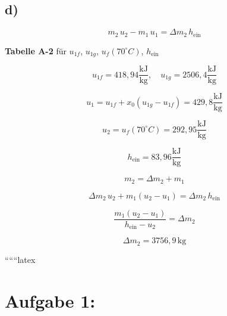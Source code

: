 

\subsection*{d)}

\begin{equation*}
m_2 \, u_2 - m_1 \, u_1 = \Delta m_2 \, h_{\text{ein}}
\end{equation*}

\textbf{Tabelle A-2} für $u_{1f}$, $u_{1g}$, $u_f (70^\circ C)$, $h_{\text{ein}}$

\begin{equation*}
u_{1f} = 418{,}94 \frac{\text{kJ}}{\text{kg}}, \quad u_{1g} = 2506{,}4 \frac{\text{kJ}}{\text{kg}}
\end{equation*}

\begin{equation*}
u_1 = u_{1f} + x_0 (u_{1g} - u_{1f}) = 429{,}8 \frac{\text{kJ}}{\text{kg}}
\end{equation*}

\begin{equation*}
u_2 = u_f (70^\circ C) = 292{,}95 \frac{\text{kJ}}{\text{kg}}
\end{equation*}

\begin{equation*}
h_{\text{ein}} = 83{,}96 \frac{\text{kJ}}{\text{kg}}
\end{equation*}

\begin{equation*}
m_2 = \Delta m_2 + m_1
\end{equation*}

\begin{equation*}
\Delta m_2 \, u_2 + m_1 (u_2 - u_1) = \Delta m_2 \, h_{\text{ein}}
\end{equation*}

\begin{equation*}
\frac{m_1 (u_2 - u_1)}{h_{\text{ein}} - u_2} = \Delta m_2
\end{equation*}

\begin{equation*}
\Delta m_2 = 3756{,}9 \, \text{kg}
\end{equation*}

``````latex


\section*{Aufgabe 1:}